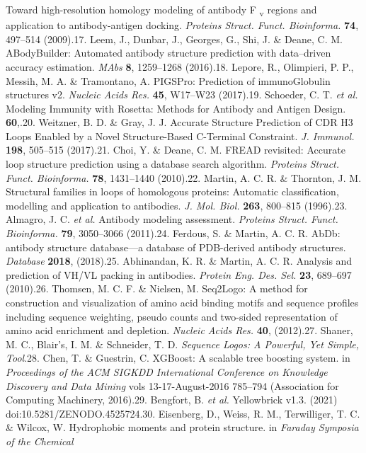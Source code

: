 \documentclass[
]{article}
\begin{document}
{{{Toward high-resolution homology modeling of antibody F \textsubscript{v}
regions and application to antibody-antigen docking. \emph{Proteins
Struct. Funct. Bioinforma.} \textbf{74}, 497--514 (2009).17. Leem, J.,
Dunbar, J., Georges, G., Shi, J. \& Deane, C. M. ABodyBuilder: Automated
antibody structure prediction with data--driven accuracy estimation.
\emph{MAbs} \textbf{8}, 1259--1268 (2016).18. Lepore, R., Olimpieri, P.
P., Messih, M. A. \& Tramontano, A. PIGSPro: Prediction of
immunoGlobulin structures v2. \emph{Nucleic Acids Res.} \textbf{45},
W17--W23 (2017).19. Schoeder, C. T. \emph{et al.} Modeling Immunity with
Rosetta: Methods for Antibody and Antigen Design. \textbf{60},.20.
Weitzner, B. D. \& Gray, J. J. Accurate Structure Prediction of CDR H3
Loops Enabled by a Novel Structure-Based C-Terminal Constraint. \emph{J.
Immunol.} \textbf{198}, 505--515 (2017).21. Choi, Y. \& Deane, C. M.
FREAD revisited: Accurate loop structure prediction using a database
search algorithm. \emph{Proteins Struct. Funct. Bioinforma.}
\textbf{78}, 1431--1440 (2010).22. Martin, A. C. R. \& Thornton, J. M.
Structural families in loops of homologous proteins: Automatic
classification, modelling and application to antibodies. \emph{J. Mol.
Biol.} \textbf{263}, 800--815 (1996).23. Almagro, J. C. \emph{et al.}
Antibody modeling assessment. \emph{Proteins Struct. Funct. Bioinforma.}
\textbf{79}, 3050--3066 (2011).24. Ferdous, S. \& Martin, A. C. R. AbDb:
antibody structure database---a database of PDB-derived antibody
structures. \emph{Database} \textbf{2018}, (2018).25. Abhinandan, K. R.
\& Martin, A. C. R. Analysis and prediction of VH/VL packing in
antibodies. \emph{Protein Eng. Des. Sel.} \textbf{23}, 689--697
(2010).26. Thomsen, M. C. F. \& Nielsen, M. Seq2Logo: A method for
construction and visualization of amino acid binding motifs and sequence
profiles including sequence weighting, pseudo counts and two-sided
representation of amino acid enrichment and depletion. \emph{Nucleic
Acids Res.} \textbf{40}, (2012).27. Shaner, M. C., Blair's, I. M. \&
Schneider, T. D. \emph{Sequence Logos: A Powerful, Yet Simple, Tool}.28.
Chen, T. \& Guestrin, C. XGBoost: A scalable tree boosting system. in
\emph{Proceedings of the ACM SIGKDD International Conference on
Knowledge Discovery and Data Mining} vols 13-17-August-2016 785--794
(Association for Computing Machinery, 2016).29. Bengfort, B. \emph{et
al.} Yellowbrick v1.3. (2021) doi:10.5281/ZENODO.4525724.30. Eisenberg,
D., Weiss, R. M., Terwilliger, T. C. \& Wilcox, W. Hydrophobic moments
and protein structure. in \emph{Faraday Symposia of the Chemical
}}}}
\end{document}
